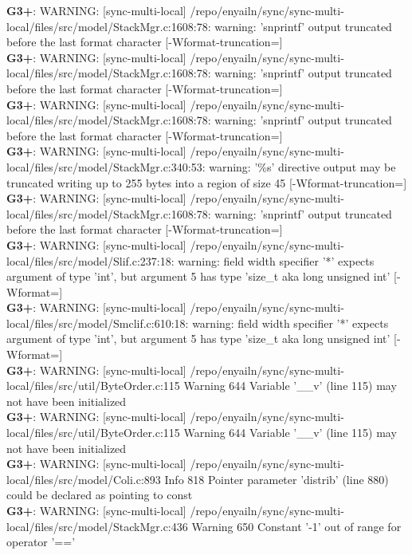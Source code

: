 \documentclass[12pt,twoside]{article}
\begin{document}
\textbf{G3+}: WARNING: [sync-multi-local] /repo/enyailn/sync/sync-multi-local/files/src/model/StackMgr.c:1608:78: warning: 'snprintf' output truncated before the last format character [-Wformat-truncation=]\\ 
\textbf{G3+}: WARNING: [sync-multi-local] /repo/enyailn/sync/sync-multi-local/files/src/model/StackMgr.c:1608:78: warning: 'snprintf' output truncated before the last format character [-Wformat-truncation=]\\ 
\textbf{G3+}: WARNING: [sync-multi-local] /repo/enyailn/sync/sync-multi-local/files/src/model/StackMgr.c:1608:78: warning: 'snprintf' output truncated before the last format character [-Wformat-truncation=]\\ 
\textbf{G3+}: WARNING: [sync-multi-local] /repo/enyailn/sync/sync-multi-local/files/src/model/StackMgr.c:340:53: warning: '\%s' directive output may be truncated writing up to 255 bytes into a region of size 45 [-Wformat-truncation=]\\ 
\textbf{G3+}: WARNING: [sync-multi-local] /repo/enyailn/sync/sync-multi-local/files/src/model/StackMgr.c:1608:78: warning: 'snprintf' output truncated before the last format character [-Wformat-truncation=]\\ 
\textbf{G3+}: WARNING: [sync-multi-local] /repo/enyailn/sync/sync-multi-local/files/src/model/Slif.c:237:18: warning: field width specifier '*' expects argument of type 'int', but argument 5 has type 'size\_t {aka long unsigned int}' [-Wformat=]\\ 
\textbf{G3+}: WARNING: [sync-multi-local] /repo/enyailn/sync/sync-multi-local/files/src/model/Smclif.c:610:18: warning: field width specifier '*' expects argument of type 'int', but argument 5 has type 'size\_t {aka long unsigned int}' [-Wformat=]\\ 
\textbf{G3+}: WARNING: [sync-multi-local] /repo/enyailn/sync/sync-multi-local/files/src/util/ByteOrder.c:115 Warning 644 Variable '\_\_v' (line 115) may not have been initialized\\ 
\textbf{G3+}: WARNING: [sync-multi-local] /repo/enyailn/sync/sync-multi-local/files/src/util/ByteOrder.c:115 Warning 644 Variable '\_\_v' (line 115) may not have been initialized\\ 
\textbf{G3+}: WARNING: [sync-multi-local] /repo/enyailn/sync/sync-multi-local/files/src/model/Coli.c:893 Info 818 Pointer parameter 'distrib' (line 880) could be declared as pointing to const\\ 
\textbf{G3+}: WARNING: [sync-multi-local] /repo/enyailn/sync/sync-multi-local/files/src/model/StackMgr.c:436 Warning 650 Constant '-1' out of range for operator '=='\\ 
\end{document}
